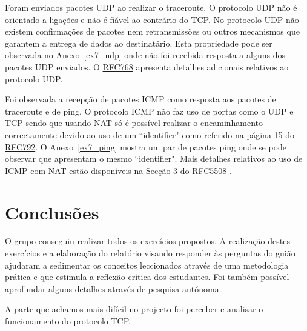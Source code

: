 \documentclass[11pt,a4paper,reqno]{report}
\numberwithin{equation}{section}
\begin{document}
Foram enviados pacotes UDP ao realizar o traceroute. O protocolo UDP não é orientado a ligações e não é fiável ao contrário do TCP. No protocolo UDP não existem confirmações de pacotes nem retransmissões ou outros mecanismos que garantem a entrega de dados ao destinatário. Esta propriedade pode ser observada no Anexo~\ref{ex7_udp} onde não foi recebida resposta a alguns dos pacotes UDP enviados. O \href{https://www.ietf.org/rfc/rfc768.txt}{RFC768} apresenta detalhes adicionais relativos ao protocolo UDP.

Foi observada a recepção de pacotes ICMP como resposta aos pacotes de traceroute e de ping. O protocolo ICMP não faz uso de portas como o UDP e TCP sendo que usando NAT só é possível realizar o encaminhamento correctamente devido ao uso de um ``identifier" como referido na página 15 do \href{https://www.ietf.org/rfc/rfc792.txt}{RFC792}. O Anexo~\ref{ex7_ping} mostra um par de pacotes ping onde se pode observar que apresentam o mesmo ``identifier". Mais detalhes relativos ao uso de ICMP com NAT estão disponíveis na Secção 3 do \href{https://www.ietf.org/rfc/rfc5508.txt}{RFC5508} . 


\chapter{Conclusões}

O grupo conseguiu realizar todos os exercícios propostos. A realização destes exercícios e a elaboração do relatório visando responder às perguntas do guião ajudaram a sedimentar os conceitos leccionados através de uma metodologia prática e que estimula a reflexão crítica dos estudantes. Foi também possível aprofundar alguns detalhes através de pesquisa autónoma. 

A parte que achamos mais difícil no projecto foi perceber e analisar o funcionamento do protocolo TCP.
\end{document}
